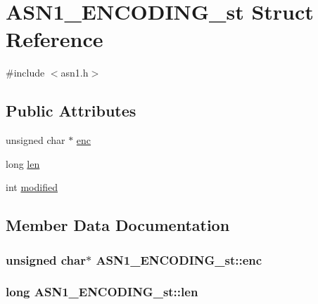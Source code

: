\hypertarget{struct_a_s_n1___e_n_c_o_d_i_n_g__st}{}\section{A\+S\+N1\+\_\+\+E\+N\+C\+O\+D\+I\+N\+G\+\_\+st Struct Reference}
\label{struct_a_s_n1___e_n_c_o_d_i_n_g__st}


{\ttfamily \#include $<$asn1.\+h$>$}

\subsection*{Public Attributes}
\begin{DoxyCompactItemize}
\item 
unsigned char $\ast$ \hyperlink{struct_a_s_n1___e_n_c_o_d_i_n_g__st_afa11cb714645d40f5602574e57ac8cb9}{enc}
\item 
long \hyperlink{struct_a_s_n1___e_n_c_o_d_i_n_g__st_a1d4db56d95977ef9daad570912a187cc}{len}
\item 
int \hyperlink{struct_a_s_n1___e_n_c_o_d_i_n_g__st_a81a85e0aa68d4a31fe277f88d7f1fdd5}{modified}
\end{DoxyCompactItemize}


\subsection{Member Data Documentation}
\subsubsection[{\texorpdfstring{enc}{enc}}]{\setlength{\rightskip}{0pt plus 5cm}unsigned char$\ast$ A\+S\+N1\+\_\+\+E\+N\+C\+O\+D\+I\+N\+G\+\_\+st\+::enc}\hypertarget{struct_a_s_n1___e_n_c_o_d_i_n_g__st_afa11cb714645d40f5602574e57ac8cb9}{}\label{struct_a_s_n1___e_n_c_o_d_i_n_g__st_afa11cb714645d40f5602574e57ac8cb9}
\subsubsection[{\texorpdfstring{len}{len}}]{\setlength{\rightskip}{0pt plus 5cm}long A\+S\+N1\+\_\+\+E\+N\+C\+O\+D\+I\+N\+G\+\_\+st\+::len}\hypertarget{struct_a_s_n1___e_n_c_o_d_i_n_g__st_a1d4db56d95977ef9daad570912a187cc}{}\label{struct_a_s_n1___e_n_c_o_d_i_n_g__st_a1d4db56d95977ef9daad570912a187cc}
